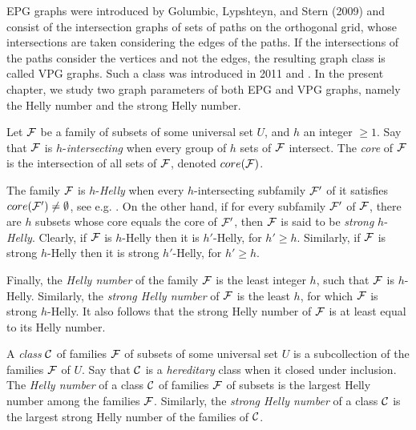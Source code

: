 
EPG graphs were introduced by Golumbic, Lypshteyn, and Stern (2009) and consist of the intersection graphs of sets of paths on the orthogonal grid, whose intersections are taken considering the edges of the paths. If the intersections of the paths consider the vertices and not the edges, the resulting graph class is called VPG graphs. Such a class was introduced in 2011 \cite{asinowski2011string} and \cite{asinowski2012}.  In the present chapter, we study two graph parameters of both EPG and VPG graphs, namely the Helly number and the strong Helly number.

Let $\cal {F}$ be a family of subsets of some universal set $U$, and $h$ an integer $\geq 1$.  Say that $\cal{F}$ is $h$-{\it intersecting} when every group of $h$ sets of $\cal {F}$ intersect. The {\it core} of $\cal {F}$ is the intersection of all sets of $\cal {F}$, denoted $core(\cal F)$. 

The family $\cal{F}$ is $h$-{\it Helly}  when every $h$-intersecting subfamily $\cal{F'}$ of it satisfies $core(\cal{F'}) \neq \emptyset$, see e.g. \cite{duchet1978propriete}. On the other hand, if for every subfamily $\cal{F'}$ of $\cal{F}$, there are $h$ subsets whose core equals the core of  $\cal {F'}$, then $\cal {F}$ is said to be {\it strong} $h$-{\it Helly}. Clearly, if $\cal {F}$ is $h$-Helly then it is $h'$-Helly, for $h' \geq h$. Similarly, 
 if ${\cal F}$ is strong $h$-Helly then it is strong $h'$-Helly, for $h' \geq h$. 

Finally, the  {\it Helly number} of the family $\cal{F}$ is the least integer $h$, such that $\cal{F}$ is $h$-Helly. Similarly, the {\it strong Helly number} of $\cal{F}$ is the least $h$, for which  $\cal{F}$ is strong $h$-Helly. It also follows that the strong Helly number of $\cal{F}$ is at least equal to its  Helly number.


A {\it class} $\cal {C}$ of families $\cal {F}$  of subsets of some universal set $U$ is a subcollection  of the families  $\cal {F}$ of $U$. Say that $\cal C$ is a {\it hereditary} class when it closed under inclusion. The {\it Helly number} of a class $\cal{C}$ of families $\cal{F}$ of subsets is the largest Helly number among the families $\cal {F}$. Similarly, the {\it strong Helly number} of a class $\cal {C}$ is the largest strong Helly number of the families of $\cal {C}$.

